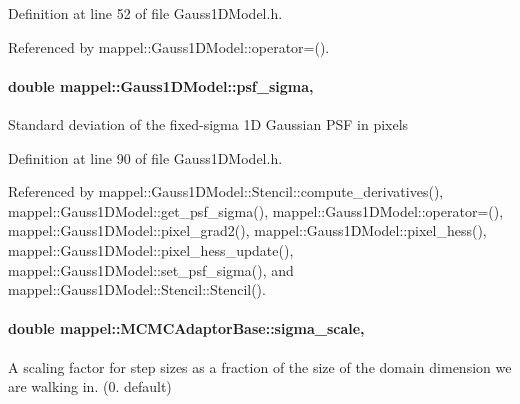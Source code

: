 Definition at line 52 of file Gauss1\+D\+Model.\+h.



Referenced by mappel\+::\+Gauss1\+D\+Model\+::operator=().

\paragraph[{\texorpdfstring{psf\+\_\+sigma}{psf_sigma}}]{\setlength{\rightskip}{0pt plus 5cm}double mappel\+::\+Gauss1\+D\+Model\+::psf\+\_\+sigma\hspace{0.3cm}{\ttfamily [protected]}, {\ttfamily [inherited]}}\hypertarget{classmappel_1_1Gauss1DModel_a62c6b2a5d8ab5f5596504a19daed66b2}{}\label{classmappel_1_1Gauss1DModel_a62c6b2a5d8ab5f5596504a19daed66b2}
Standard deviation of the fixed-\/sigma 1D Gaussian P\+SF in pixels 

Definition at line 90 of file Gauss1\+D\+Model.\+h.



Referenced by mappel\+::\+Gauss1\+D\+Model\+::\+Stencil\+::compute\+\_\+derivatives(), mappel\+::\+Gauss1\+D\+Model\+::get\+\_\+psf\+\_\+sigma(), mappel\+::\+Gauss1\+D\+Model\+::operator=(), mappel\+::\+Gauss1\+D\+Model\+::pixel\+\_\+grad2(), mappel\+::\+Gauss1\+D\+Model\+::pixel\+\_\+hess(), mappel\+::\+Gauss1\+D\+Model\+::pixel\+\_\+hess\+\_\+update(), mappel\+::\+Gauss1\+D\+Model\+::set\+\_\+psf\+\_\+sigma(), and mappel\+::\+Gauss1\+D\+Model\+::\+Stencil\+::\+Stencil().

\paragraph[{\texorpdfstring{sigma\+\_\+scale}{sigma_scale}}]{\setlength{\rightskip}{0pt plus 5cm}double mappel\+::\+M\+C\+M\+C\+Adaptor\+Base\+::sigma\+\_\+scale\hspace{0.3cm}{\ttfamily [protected]}, {\ttfamily [inherited]}}\hypertarget{classmappel_1_1MCMCAdaptorBase_a76312f7d589bf3f3e754beca174b884b}{}\label{classmappel_1_1MCMCAdaptorBase_a76312f7d589bf3f3e754beca174b884b}
A scaling factor for step sizes as a fraction of the size of the domain dimension we are walking in. (0. default) 

